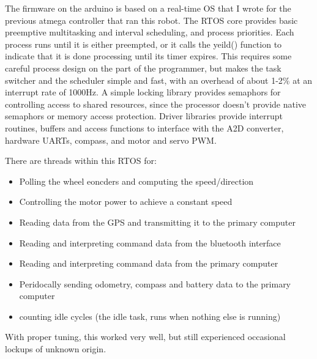 
The firmware on the arduino is based on a real-time OS that I wrote for the previous atmega controller that ran this robot. 
The RTOS core provides basic preemptive multitasking and interval scheduling, and process priorities. Each process runs until it is either preempted, or it calls the yeild() function to indicate that it is done processing until its timer expires. This requires some careful process design on the part of the programmer, but makes the task switcher and the scheduler simple and fast, with an overhead of about 1-2\% at an interrupt rate of 1000Hz.
A simple locking library provides semaphors for controlling access to shared resources, since the processor doesn't provide native semaphors or memory access protection.
Driver libraries provide interrupt routines, buffers and access functions to interface with the A2D converter, hardware UARTs, compass, and motor and servo PWM.

There are threads within this RTOS for:
\begin{itemize}
   \item Polling the wheel eoncders and computing the speed/direction
   \item Controlling the motor power to achieve a constant speed
   \item Reading data from the GPS and transmitting it to the primary computer
   \item Reading and interpreting command data from the bluetooth interface
   \item Reading and interpreting command data from the primary computer
   \item Peridocally sending odometry, compass and battery data to the primary computer
   \item counting idle cycles (the idle task, runs when nothing else is running)
\end{itemize}

With proper tuning, this worked very well, but still experienced occasional lockups of unknown origin.

